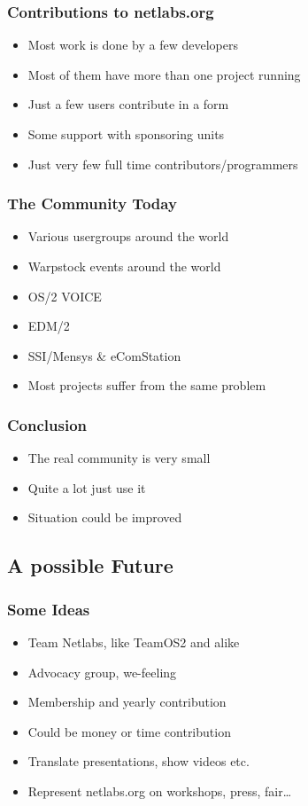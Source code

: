 \documentclass{beamer}
\begin{document}
\begin{frame}
\frametitle{Contributions to netlabs.org}
\begin{itemize}[<+->]
  \item Most work is done by a few developers
  \item Most of them have more than one project running
  \item Just a few users contribute in a form
  \item Some support with sponsoring units
  \item Just very few full time contributors/programmers
\end{itemize}
\end{frame}

\begin{frame}
\frametitle{The Community Today}
\begin{itemize}[<+->]
  \item Various usergroups around the world
  \item Warpstock events around the world
  \item OS/2 VOICE
  \item EDM/2
  \item SSI/Mensys \& eComStation
  \item Most projects suffer from the same problem
\end{itemize}
\end{frame}

\begin{frame}
\frametitle{Conclusion}
\begin{itemize}[<+->]
  \item The real community is very small
  \item Quite a lot just use it
  \item Situation could be improved
\end{itemize}
\end{frame}

\subsection{A possible Future}
\begin{frame}
\frametitle{Some Ideas}
\begin{itemize}[<+->]
  \item Team Netlabs, like TeamOS2 and alike
  \item Advocacy group, we-feeling
  \item Membership and yearly contribution
  \item Could be money or time contribution
  \item Translate presentations, show videos etc.
  \item Represent netlabs.org on workshops, press, fair\ldots
\end{itemize}
\end{frame}
\end{document}
